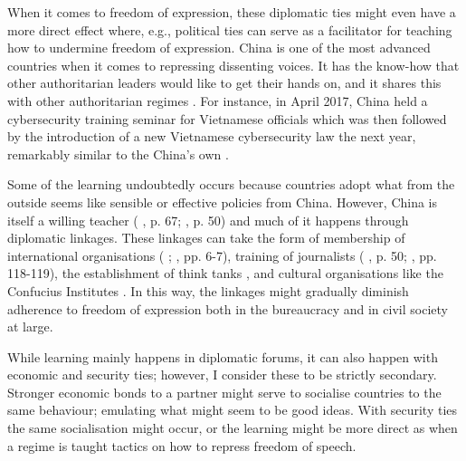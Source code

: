 When it comes to freedom of expression, these diplomatic ties might even have a more direct effect where, e.g., political ties can serve as a facilitator for teaching how to undermine freedom of expression. China is one of the most advanced countries when it comes to repressing dissenting voices. It has the know-how that other authoritarian leaders would like to get their hands on, and it shares this with other authoritarian regimes \citep[pp. 3-6]{economy_exporting_2020}. For instance, in April 2017, China held a cybersecurity training seminar for Vietnamese officials which was then followed by the introduction of a new Vietnamese cybersecurity law the next year, remarkably similar to the China's own \citep[p. 8]{shahbaz_rise_2018}. 

Some of the learning undoubtedly occurs because countries adopt what from the outside seems like sensible or effective policies from China. However, China is itself a willing teacher (\citeauthor{brazys_chinas_2020} \citeyear{brazys_chinas_2020}, p. 67; \citeauthor{repucci_authoritarians_2022} \citeyear{repucci_authoritarians_2022}, p. 50) and much of it happens through diplomatic linkages. These linkages can take the form of membership of international organisations (\citeauthor{ambrosio_catching_2008} \citeyear{ambrosio_catching_2008}; \citeauthor{economy_exporting_2020} \citeyear{economy_exporting_2020}, pp. 6-7), training of journalists (\citeauthor{brazys_chinas_2020} \citeyear{brazys_chinas_2020}, p. 50; \citeauthor{cook_countering_2022} \citeyear{cook_countering_2022}, pp. 118-119), the establishment of think tanks \citep[pp. 15-16]{loughlin_chinese_2021}, and cultural organisations like the Confucius Institutes \citep{popovic_charm_2020}. In this way, the linkages might gradually diminish adherence to freedom of expression both in the bureaucracy and in civil society at large. 

While learning mainly happens in diplomatic forums, it can also happen with economic and security ties; however, I consider these to be strictly secondary. Stronger economic bonds to a partner might serve to socialise countries to the same behaviour; emulating what might seem to be good ideas. With security ties the same socialisation might occur, or the learning might be more direct as when a regime is taught tactics on how to repress freedom of speech. 

